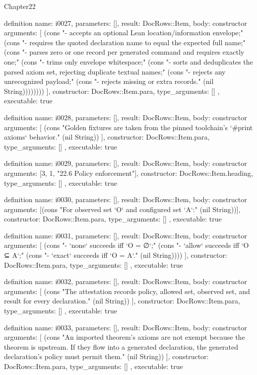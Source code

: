 \begin{lexlean}{Chapter22}
\begin{semanticmodule}
definition{
  name: i0027,
  parameters: [],
  result: DocRows::Item,
  body: constructor{
    arguments: [
      (cons "- accepts an optional Lean location/information envelope;" (cons "- requires the quoted declaration name to equal the expected full name;" (cons "- parses zero or one record per generated command and requires exactly one;" (cons "- trims only envelope whitespace;" (cons "- sorts and deduplicates the parsed axiom set, rejecting duplicate textual names;" (cons "- rejects any unrecognized payload;" (cons "- rejects missing or extra records." (nil String))))))))
    ],
    constructor: DocRows::Item.para,
    type_arguments: []
  },
  executable: true
}

definition{
  name: i0028,
  parameters: [],
  result: DocRows::Item,
  body: constructor{
    arguments: [
      (cons "Golden fixtures are taken from the pinned toolchain's `#print axioms` behavior." (nil String))
    ],
    constructor: DocRows::Item.para,
    type_arguments: []
  },
  executable: true
}

definition{
  name: i0029,
  parameters: [],
  result: DocRows::Item,
  body: constructor{
    arguments: [3, 1, "22.6 Policy enforcement"],
    constructor: DocRows::Item.heading,
    type_arguments: []
  },
  executable: true
}

definition{
  name: i0030,
  parameters: [],
  result: DocRows::Item,
  body: constructor{
    arguments: [(cons "For observed set `O` and configured set `A`:" (nil String))],
    constructor: DocRows::Item.para,
    type_arguments: []
  },
  executable: true
}

definition{
  name: i0031,
  parameters: [],
  result: DocRows::Item,
  body: constructor{
    arguments: [
      (cons "- `none` succeeds iff `O = ∅`;" (cons "- `allow` succeeds iff `O ⊆ A`;" (cons "- `exact` succeeds iff `O = A`." (nil String))))
    ],
    constructor: DocRows::Item.para,
    type_arguments: []
  },
  executable: true
}

definition{
  name: i0032,
  parameters: [],
  result: DocRows::Item,
  body: constructor{
    arguments: [
      (cons "The attestation records policy, allowed set, observed set, and result for every declaration." (nil String))
    ],
    constructor: DocRows::Item.para,
    type_arguments: []
  },
  executable: true
}

definition{
  name: i0033,
  parameters: [],
  result: DocRows::Item,
  body: constructor{
    arguments: [
      (cons "An imported theorem's axioms are not exempt because the theorem is upstream. If they flow into a generated declaration, the generated declaration's policy must permit them." (nil String))
    ],
    constructor: DocRows::Item.para,
    type_arguments: []
  },
  executable: true
}


\end{semanticmodule}
\end{lexlean}

